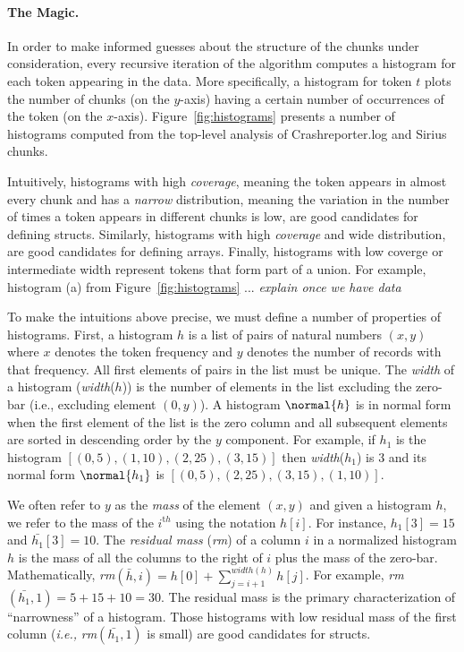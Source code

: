 \paragraph*{The Magic.}
In order to make informed guesses about the structure of the chunks
under consideration, every recursive iteration of the algorithm computes 
a histogram for each token appearing in the data.
More specifically, a histogram for token $t$
plots the number of chunks (on the $y$-axis)
having a certain number of occurrences of the token (on the $x$-axis). 
Figure~\ref{fig:histograms} presents a number of histograms computed
from the top-level analysis of Crashreporter.log and Sirius chunks.

Intuitively, histograms with high {\em coverage}, meaning the token appears
in almost every chunk and has a {\em narrow} distribution, meaning the variation in
the number of times a token appears in different chunks is low, are
good candidates for defining structs.  Similarly, histograms with
high {\em coverage} and wide distribution, are good candidates for defining
arrays.  Finally, histograms with low coverge or intermediate width
represent tokens that form part of a union.  For example, histogram (a)
from Figure~\ref{fig:histograms} ... {\em explain once we have data}

To make the intuitions above precise, we must define a number of
properties of histograms.  First, a histogram $h$ is a list of pairs
of natural numbers $(x,y)$ where $x$ denotes the token frequency and
$y$ denotes the number of records with that frequency.  
All first elements of pairs in the list must be unique.  
The {\em width} of a
histogram ({\em width}($h$)) is the number of elements in the list
excluding the zero-bar ({i.e.,} excluding element $(0,y)$).  
A histogram
$\normal{h}$ is in normal form when the first element of the list is
the zero column and all subsequent elements are sorted in descending
order by the $y$ component.  For example, if $h_1$ is the histogram
$[(0,5), (1,10), (2,25), (3,15)]$ then {\em width}($h_1$) is 3 and its
normal form $\normal{h_1}$ is $[(0,5), (2, 25), (3,15), (1,10)]$.

We often refer to $y$ as the {\em mass} of the element $(x,y)$
and given a histogram $h$, we refer to the mass of the $i^{\mathrm th}$
using the notation $h[i]$.  For instance, $h_1[3] = 15$ and 
$\bar{h_1}[3] = 10$.  The {\em residual mass} ({\em rm}) of a column $i$ in 
a normalized histogram $h$ is the mass of all the columns to the right of 
$i$ plus the mass of the zero-bar.  Mathematically, 
{\em rm}$(\bar{h},i) = h[0] + \sum_{j=i+1}^{\mathit{width}(h)} h[j]$.
For example, {\em rm}$(\bar{h_1},1) = 5 + 15 + 10 = 30$.
The residual mass is the primary characterization of ``narrowness''
of a histogram.  Those histograms with low residual mass of the first
column ({\em i.e.,} {\em rm}$(\bar{h_1},1)$ is small) 
are good candidates for structs.

